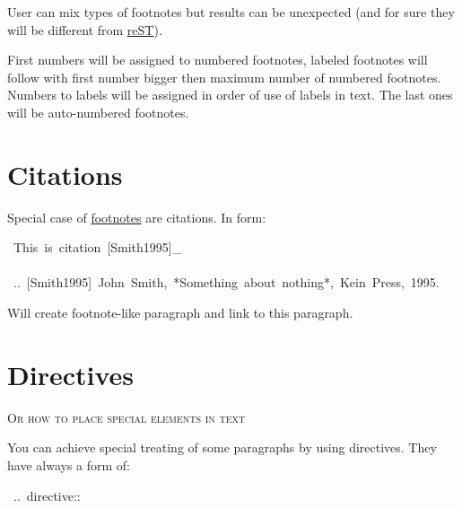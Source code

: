 \documentclass[12pt]{article}
\newcommand{\subtitle}[1]{{\large\textsc{#1}}\vskip15pt}
\begin{document}
User can mix types of footnotes but results can be unexpected (and for sure
they will be different from \href{http://docutils.sf.net}{reST}).

First numbers will be assigned to numbered footnotes, labeled footnotes will
follow with first number bigger then maximum number of numbered footnotes.
Numbers to labels will be assigned in order of use of labels in text. The last
ones will be auto-numbered footnotes.

\begin{center}
\end{center}
\hypertarget{lcitations}{}
\section{Citations}

Special case of \href{\#lfootnotes}{footnotes} are citations. In form:

\begin{ttfamily}\begin{flushleft}
\mbox{~This~is~citation~[Smith1995]\_}\\
\mbox{}\\
\mbox{~..~[Smith1995]~John~Smith,~*Something~about~nothing*,~Kein~Press,~1995.}\\
\end{flushleft}\end{ttfamily}

Will create footnote-like paragraph and link to this paragraph.

\hypertarget{ldirectives}{}
\section{Directives}

\subtitle{Or how to place special elements in text
}

You can achieve special treating of some paragraphs by using
directives. They have always a form of:

\begin{ttfamily}\begin{flushleft}
\mbox{~..~directive::}\\
\end{flushleft}\end{ttfamily}
\end{document}
